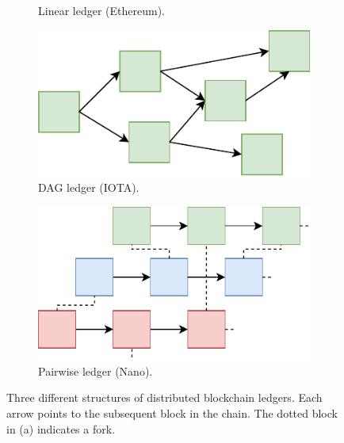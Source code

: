 \begin{figure}[t!]
	\centering
	\begin{subfigure}[t]{.5\textwidth}
		\centering
		\captionsetup{width=.9\linewidth}
		\caption{Linear ledger (Ethereum).}
		\label{fig:blockchain_single}
	\end{subfigure}%
	\begin{subfigure}[t]{.5\textwidth}
		\centering
		\captionsetup{width=.9\linewidth}
		\includegraphics[width=.9\linewidth]{devid/resources/blockchain_dag}
		\caption{DAG ledger (IOTA).}
		\label{fig:blockchain_dag}
	\end{subfigure}\vspace{0.5cm}
	\begin{subfigure}[t]{.5\textwidth}
		\centering
		\captionsetup{width=.9\linewidth}
		\includegraphics[width=\linewidth]{devid/resources/blockchain_pairwise}
		\caption{Pairwise ledger (Nano).}
		\label{fig:blockchain_pairwise}
	\end{subfigure}%
	\caption{Three different structures of distributed blockchain ledgers. Each arrow points to the subsequent block in the chain. The dotted block in (a) indicates a fork.}
	\label{fig:blockchain_structures}
\end{figure}

